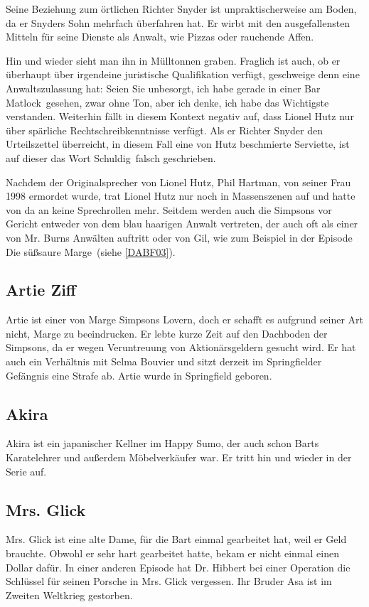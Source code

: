 {Seine Beziehung zum örtlichen Richter Snyder ist unpraktischerweise am Boden, da er Snyders Sohn mehrfach überfahren hat. Er wirbt mit den ausgefallensten Mitteln für seine Dienste als Anwalt, wie Pizzas oder rauchende Affen. 

Hin und wieder sieht man ihn in Mülltonnen graben. Fraglich ist auch, ob er überhaupt über irgendeine juristische Qualifikation verfügt, geschweige denn eine Anwaltszulassung hat: \glqq Seien Sie unbesorgt, ich habe gerade in einer Bar \glq Matlock\grq\ gesehen, zwar ohne Ton, aber ich denke, ich habe das Wichtigste verstanden\grqq . Weiterhin fällt in diesem Kontext negativ auf, dass Lionel Hutz nur über spärliche Rechtschreibkenntnisse verfügt. Als er Richter Snyder den Urteilszettel überreicht, in diesem Fall eine von Hutz beschmierte Serviette, ist auf dieser das Wort \glqq Schuldig\grqq\ falsch geschrieben.

Nachdem der Originalsprecher von Lionel Hutz, Phil Hartman, von seiner Frau 1998 ermordet wurde, trat Lionel Hutz nur noch in Massenszenen auf und hatte von da an keine Sprechrollen mehr. Seitdem werden auch die Simpsons vor Gericht entweder von dem blau haarigen Anwalt vertreten, der auch oft als einer von Mr. Burns Anwälten auftritt oder von Gil, wie zum Beispiel in der Episode \glqq Die süßsaure Marge\grqq\ (siehe \ref{DABF03}). 

\subsection{Artie Ziff}\label{ArtieZiff}
Artie ist einer von Marge Simpsons Lovern, doch er schafft es aufgrund seiner Art nicht, Marge zu beeindrucken. Er lebte kurze Zeit auf den Dachboden der Simpsons, da er wegen Veruntreuung von Aktionärsgeldern gesucht wird. Er hat auch ein Verhältnis mit Selma Bouvier und sitzt derzeit im Springfielder Gefängnis eine Strafe ab. Artie wurde in Springfield geboren.

\subsection{Akira}
Akira ist ein japanischer Kellner im Happy Sumo, der auch schon Barts Karatelehrer und außerdem Möbelverkäufer war. Er tritt hin und wieder in der Serie auf.

\subsection{Mrs. Glick}
Mrs. Glick ist eine alte Dame, für die Bart einmal gearbeitet hat, weil er Geld brauchte. Obwohl er sehr hart gearbeitet hatte, bekam er nicht einmal einen Dollar dafür. In einer anderen Episode hat Dr. Hibbert bei einer Operation die Schlüssel für seinen Porsche in Mrs. Glick vergessen. Ihr Bruder Asa ist im Zweiten Weltkrieg gestorben.

}
